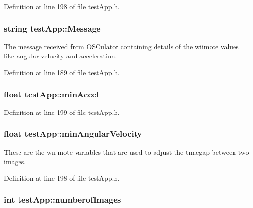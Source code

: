 Definition at line 198 of file test\-App.\-h.

\hypertarget{classtest_app_a0124035d0454fb6bd9152f8a87c40677}{
\subsubsection[{Message}]{\setlength{\rightskip}{0pt plus 5cm}string test\-App\-::\-Message}}\label{classtest_app_a0124035d0454fb6bd9152f8a87c40677}


The message received from O\-S\-Culator containing details of the wiimote values like angular velocity and acceleration. 



Definition at line 189 of file test\-App.\-h.

\hypertarget{classtest_app_ab007edbc20b09d607f8010e2dbafdb97}{
\subsubsection[{min\-Accel}]{\setlength{\rightskip}{0pt plus 5cm}float test\-App\-::min\-Accel}}\label{classtest_app_ab007edbc20b09d607f8010e2dbafdb97}


Definition at line 199 of file test\-App.\-h.

\hypertarget{classtest_app_ac559756a01e0b98378bc29dfba9fac79}{
\subsubsection[{min\-Angular\-Velocity}]{\setlength{\rightskip}{0pt plus 5cm}float test\-App\-::min\-Angular\-Velocity}}\label{classtest_app_ac559756a01e0b98378bc29dfba9fac79}


These are the wii-\/mote variables that are used to adjust the timegap between two images. 



Definition at line 198 of file test\-App.\-h.

\hypertarget{classtest_app_a957cf7fdb3ea964a88ca1be13e4d68fc}{
\subsubsection[{numberof\-Images}]{\setlength{\rightskip}{0pt plus 5cm}int test\-App\-::numberof\-Images}}\label{classtest_app_a957cf7fdb3ea964a88ca1be13e4d68fc}


